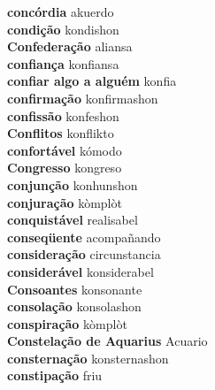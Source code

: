 \textbf{ concórdia  } akuerdo \\
\textbf{ condição  } kondishon \\
\textbf{ Confederação  } aliansa \\
\textbf{ confiança  } konfiansa \\
\textbf{ confiar algo a alguém  } konfia \\
\textbf{ confirmação  } konfirmashon \\
\textbf{ confissão  } konfeshon \\
\textbf{ Conflitos  } konflikto \\
\textbf{ confortável  } kómodo \\
\textbf{ Congresso  } kongreso \\
\textbf{ conjunção  } konhunshon \\
\textbf{ conjuração  } kòmplòt \\
\textbf{ conquistável  } realisabel \\
\textbf{ conseqüente  } acompañando \\
\textbf{ consideração  } circunstancia \\
\textbf{ considerável  } konsiderabel \\
\textbf{ Consoantes  } konsonante \\
\textbf{ consolação  } konsolashon \\
\textbf{ conspiração  } kòmplòt \\
\textbf{ Constelação de Aquarius  } Acuario \\
\textbf{ consternação  } konsternashon \\
\textbf{ constipação  } friu \\
